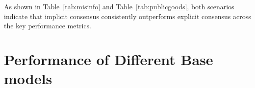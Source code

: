 \begin{table}[t]
\centering
\small
\caption{Overall results of the \textbf{Dynamic Public-Goods Provision} scenario: Comparison between Explicit and Implicit Consensus. Metrics include Provision Rate (PR, higher is better), Total Welfare (TW, net total payoff, higher is better, note that the TW is not directly the benefit $B(t)$), and Free-rider Disparity (FD, lower is better).}
\renewcommand{\arraystretch}{1.2}
\setlength{\tabcolsep}{4pt}
\label{tab:publicgoods}
\end{table}

As shown in Table~\ref{tab:misinfo} and Table~\ref{tab:publicgoods}, both scenarios indicate that implicit consensus consistently outperforms explicit consensus across the key performance metrics.

\section{Performance of Different Base models}
\label{sec:appendix:f}

